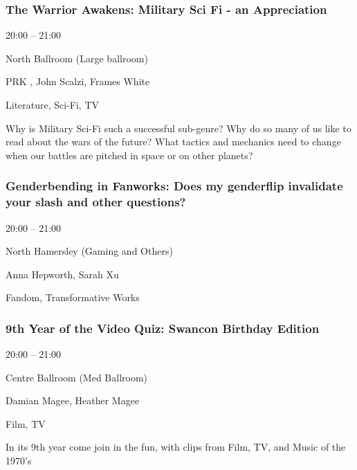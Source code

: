 \documentclass{scrreprt}
\begin{document}
\begin{multicols}{2}
\subsubsection*{The Warrior Awakens: Military Sci Fi - an Appreciation}\begin{description}
\setlength{\itemsep}{0pt}
\setlength{\parsep}{0pt}
\setlength{\parskip}{0pt}
\item[Time:]{20:00 -- 21:00}
\item[Venue:]{North Ballroom (Large ballroom)}
\item[People:]{PRK , John Scalzi, Frames White}
\item[Tags:]{Literature, Sci-Fi, TV}\end{description}
Why is Military Sci-Fi such a successful sub-genre? Why do so many of us like to read about the wars of the future? What tactics and mechanics need to change when our battles are pitched in space or on other planets?
\subsubsection*{Genderbending in Fanworks: Does my genderflip invalidate your slash and other questions?}\begin{description}
\setlength{\itemsep}{0pt}
\setlength{\parsep}{0pt}
\setlength{\parskip}{0pt}
\item[Time:]{20:00 -- 21:00}
\item[Venue:]{North Hamersley (Gaming and Others)}
\item[People:]{Anna Hepworth, Sarah Xu}
\item[Tags:]{Fandom, Transformative Works}\end{description}

\subsubsection*{9th Year of the Video Quiz: Swancon Birthday Edition}\begin{description}
\setlength{\itemsep}{0pt}
\setlength{\parsep}{0pt}
\setlength{\parskip}{0pt}
\item[Time:]{20:00 -- 21:00}
\item[Venue:]{Centre Ballroom (Med Ballroom)}
\item[People:]{Damian Magee, Heather Magee}
\item[Tags:]{Film, TV}\end{description}
In its 9th year come join in the fun, with clips from Film, TV, and Music of the 1970’s

\end{multicols}
\end{document}
